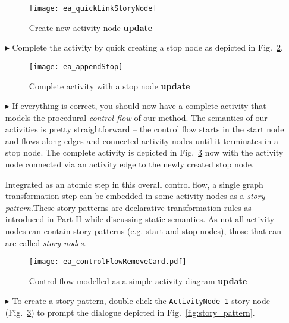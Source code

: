 \begin{itemize}
\begin{figure}[htp]
\begin{center}
  \texttt{[image: ea\_quickLinkStoryNode]}
  \caption{Create new activity node {\bf update}}  
  \label{fig:sdm_new_activity_node}
\end{center}
\end{figure}

\item[$\blacktriangleright$] Complete the activity by quick creating a stop node as depicted in Fig.~\ref{fig:sdm_stop_node}.

\begin{figure}[htp]
\begin{center}
  \texttt{[image: ea\_appendStop]}
  \caption{Complete activity with a stop node {\bf update}}  
  \label{fig:sdm_stop_node}
\end{center}
\end{figure}

\item[$\blacktriangleright$] If everything is correct, you should now have a complete activity that models the procedural \emph{control flow} of our method. 
The semantics of our activities is pretty straightforward -- the control flow starts in the start node and flows along edges and connected activity nodes until
it terminates in a stop node. The complete activity is depicted in Fig.~\ref{fig:sdm_complete_control_flow_simple} now with the activity node connected via
an activity edge to the newly created stop node.

\label{story-pattern}
Integrated as an atomic step in this overall control flow, a single graph transformation step can be embedded in some activity nodes as a
\emph{story pattern}.These story patterns are declarative transformation rules as introduced in Part II while discussing static
semantics. As not all activity nodes can contain story patterns (e.g. start and stop nodes), those that can are called \emph{story nodes}.

\begin{figure}[htp]
\begin{center}
  \texttt{[image: ea\_controlFlowRemoveCard.pdf]}
  \caption{Control flow modelled as a simple activity diagram {\bf update}}  
  \label{fig:sdm_complete_control_flow_simple}
\end{center}
\end{figure}

\item[$\blacktriangleright$] To create a story pattern, double click the \texttt{ActivityNode 1} story node (Fig.~\ref{fig:sdm_complete_control_flow_simple}) to
prompt the dialogue depicted in Fig.~\ref{fig:story_pattern}.


\end{itemize}
